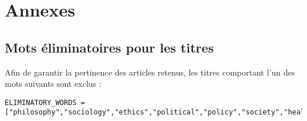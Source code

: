 \chapter{Annexes}
\appendix
\makeatletter
\def\@seccntformat#1{Annexe~\csname the#1\endcsname:\quad}
\makeatother

\section{Mots éliminatoires pour les titres}\label{annexe:mots_eliminatoires}
Afin de garantir la pertinence des articles retenus, les titres comportant l’un des mots suivants sont exclus :
\begin{lstlisting}[breaklines=true,basicstyle=\ttfamily\small]
ELIMINATORY_WORDS = ["philosophy","sociology","ethics","political","policy","society","healthcare","clinical","gender","history","art","religion","linguistics","psychology"]
\end{lstlisting}
